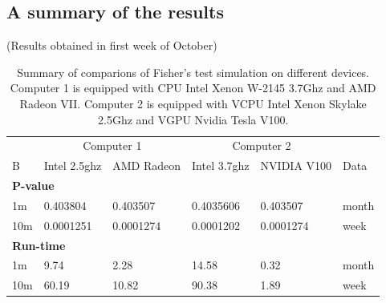 \documentclass[article,nojss]{jss}\usepackage[]{graphicx}\usepackage[]{color}
\newenvironment{knitrout}{}{} %
\begin{document}
\subsection{A summary of the results}
(Results obtained in first week of October)
\begin{knitrout}
\color{fgcolor}\begin{table}[H]

\caption{\label{tab:summarycompare}Summary of comparions of Fisher's test simulation on different devices. Computer 1 is equipped with CPU Intel Xenon W-2145 3.7Ghz and AMD Radeon VII. Computer 2 is equipped with	VCPU Intel Xenon Skylake 2.5Ghz and VGPU Nvidia Tesla V100.\label{tab:summary}}
\centering
\begin{tabular}[t]{l|l|l|l|l|l}
\hline
\multicolumn{1}{c|}{ } & \multicolumn{2}{c|}{Computer 1} & \multicolumn{2}{c|}{Computer 2} & \multicolumn{1}{c}{ } \\
\cline{2-3} \cline{4-5}
B & Intel 2.5ghz & AMD Radeon & Intel 3.7ghz & NVIDIA V100 & Data\\
\hline
\multicolumn{6}{l}{\textbf{P-value}}\\
\hline
\hspace{1em}1m & 0.403804 & 0.403507 & 0.4035606 & 0.403507 & month\\
\hline
\hspace{1em}10m & 0.0001251 & 0.0001274 & 0.0001202 & 0.0001274 & week\\
\hline
\multicolumn{6}{l}{\textbf{Run-time}}\\
\hline
\hspace{1em}1m & 9.74 & 2.28 & 14.58 & 0.32 & month\\
\hline
\hspace{1em}10m & 60.19 & 10.82 & 90.38 & 1.89 & week\\
\hline
\end{tabular}
\end{table}

\end{knitrout}
\end{document}
